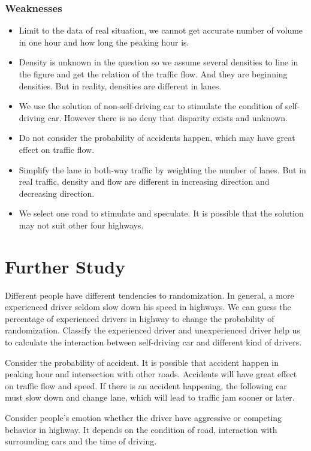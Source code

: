 \documentclass{mcmthesis}
\numberwithin{equation}{section}
\begin{document}
			\subsubsection{Weaknesses}
				\begin{itemize}
					\item Limit to the data of real situation, we cannot get accurate number of volume in one hour and how long the peaking hour is.
					\item Density is unknown in the question so we assume several densities to line in the figure and get the relation of the traffic flow. And they are beginning densities. But in reality, densities are different in lanes.
					\item We use the solution of non-self-driving car to stimulate the condition of self-driving car. However there is no deny that disparity exists and unknown.
					\item Do not consider the probability of accidents happen, which may have great effect on traffic flow.
					\item Simplify the lane in both-way traffic by weighting the number of lanes. But in real traffic, density and flow are different in increasing direction and decreasing direction.
					\item We select one road to stimulate and speculate. It is possible that the solution may not suit other four highways.
				\end{itemize}

	\section{Further Study}
		Different people have different tendencies to randomization. In general, a more experienced driver seldom slow down his speed in highways. We can guess the percentage of experienced drivers in highway to change the probability of randomization. Classify the experienced driver and unexperienced driver help us to calculate the interaction between self-driving car and different kind of drivers.

		Consider the probability of accident. It is possible that accident happen in peaking hour and intersection with other roads. Accidents will have great effect on traffic flow and speed. If there is an accident happening, the following car must slow down and change lane, which will lead to traffic jam sooner or later.

		Consider people’s emotion whether the driver have aggressive or competing behavior in highway. It depends on the condition of road, interaction with surrounding cars and the time of driving.
\end{document}
